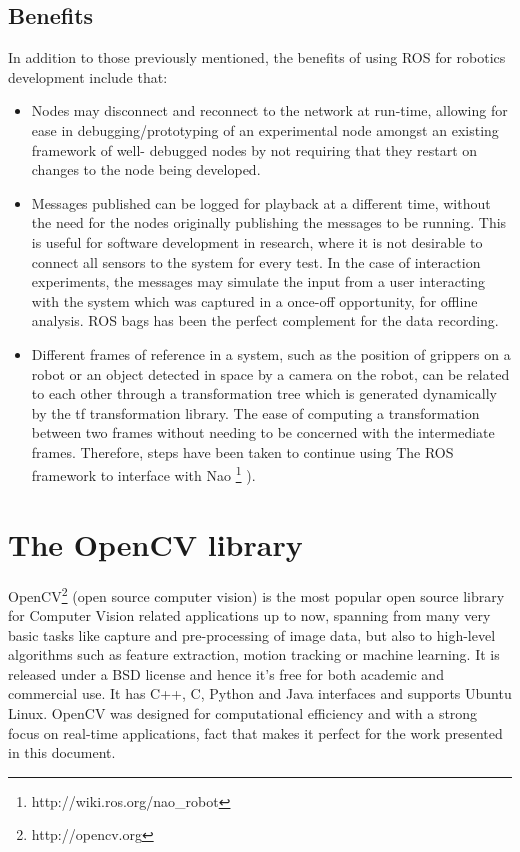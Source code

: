\subsection{Benefits}
In addition to those previously mentioned, the benefits of using ROS for robotics development
include that:
\begin{itemize}
\item Nodes may disconnect and reconnect to the network at run-time, allowing for ease in
debugging/prototyping of an experimental node amongst an existing framework of well-
debugged nodes by not requiring that they restart on changes to the node being developed.
\item Messages published can be logged for playback at a different time, without the need for
the nodes originally publishing the messages to be running. This is useful for software
development in research, where it is not desirable to connect all sensors to the system for
every test. In the case of interaction experiments, the messages may simulate the input
from a user interacting with the system which was captured in a once-off opportunity, for
offline analysis. ROS bags has been the perfect complement for the data recording.
\item Different frames of reference in a system, such as the position of grippers on a robot or an
object detected in space by a camera on the robot, can be related to each other through
a transformation tree which is generated dynamically by the tf transformation library. The ease of computing a transformation between two frames without needing to be concerned with the intermediate frames. Therefore, steps have been taken to continue using The ROS framework to interface with Nao 
\footnote{http://wiki.ros.org/nao\_robot} ). 
\end{itemize}

\section{The OpenCV library}
OpenCV\footnote{http://opencv.org} (open source computer vision) is the most popular open source library for Computer Vision related applications up to now, spanning from many very basic tasks like capture and pre-processing of image data, but also to high-level algorithms such as feature extraction, motion tracking or machine learning. It is released under a BSD license and hence it’s free for both academic and commercial use. It has C++, C, Python and Java interfaces and supports Ubuntu Linux. OpenCV was designed for computational efficiency and with a strong focus on real-time applications, fact that makes it perfect for the work presented in this document.

